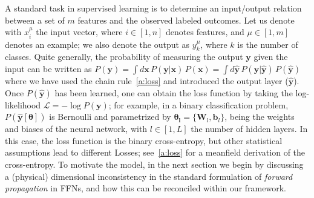 \documentclass{article}
\begin{document}
A standard task in supervised learning is to determine an input/output relation between a set of $m$ features and the observed labeled outcomes. Let us denote with $x^{\mu}_i$ the input vector, where $i \in [1, n]$ denotes features, and $\mu \in [1,m]$ denotes an example; we also denote the output as $y^{\mu}_k$, where $k$ is the number of classes. Quite generally, the probability of measuring the output $\mathbf{y}$ given the input can be written as $P(\mathbf{y}) = \int d\mathbf{x} \, P(\mathbf{y} | \mathbf{x}) \, P(\mathbf{x})  =  \int d \hat{\mathbf{y}} \, P(\mathbf{y} | \hat{\mathbf{y}} ) \, P(\hat{\mathbf{y}})$ where we have used the chain rule~\eqref{a:loss} and introduced the output layer ($\hat{ \mathbf{y}}$). Once $P(\hat{\mathbf{y}})$ has been learned, one can obtain the loss function by taking the log-likelihood $\mathscr{L} = - \log P(\mathbf{y})$; for example, in a binary classification problem, $P(\hat{\mathbf{y}}[\boldsymbol{\theta}])$ is Bernoulli and parametrized by $\boldsymbol{\theta_l} = \{\mathbf{W}_l,\mathbf{ b}_l \}$, being the weights and biases of the neural network, with $l \in [1, L]$ the number of hidden layers. In this case, the loss function is the binary cross-entropy, but other statistical assumptions lead to different Losses; see~\eqref{a:loss} for a meanfield derivation of the cross-entropy. To motivate the model, in the next section we begin by discussing a (physical) dimensional inconsistency in the standard formulation of {\it forward propagation} in FFNs, and how this can be reconciled within our framework.
\end{document}
